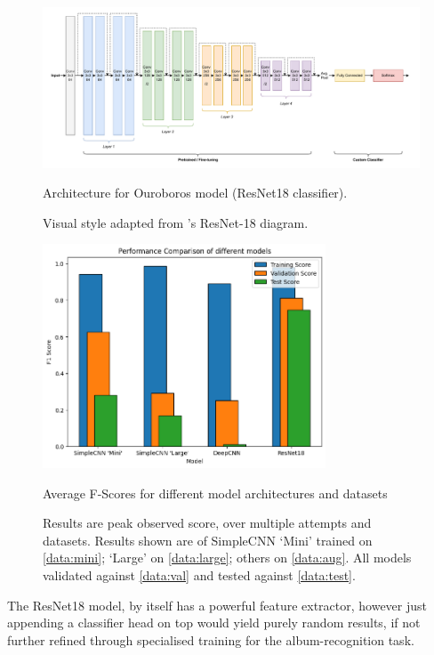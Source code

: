                 \begin{figure}[htbp]
                    \centering
                    \includegraphics[width=\linewidth]{images/Ouroboros.pdf}
                    \caption{Architecture for Ouroboros model (ResNet18 classifier).}
                    \caption*{Visual style adapted from \cite{resnet}'s ResNet-18 diagram.}
                    \label{fig:OuroborosCNN}
                \end{figure}
    
                \begin{figure}[h]
                    \centering
                    \includegraphics[width=0.75\textwidth]{images/ModelComparison.png}
                    \caption{Average F-Scores for different model architectures and datasets}
                    \label{fig:CNNComp}
                    \caption*{Results are peak observed score, over multiple attempts and datasets. Results shown are of SimpleCNN `Mini' trained on \ref{data:mini}; `Large' on \ref{data:large}; others on \ref{data:aug}. All models validated against \ref{data:val} and tested against \ref{data:test}.}
                \end{figure}
    
                The ResNet18 model, by itself has a powerful feature extractor, however just appending a classifier head on top would yield purely random results, if not further refined through specialised training for the album-recognition task.
    
